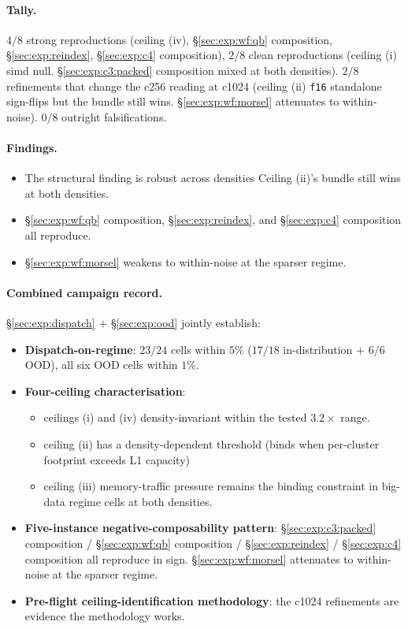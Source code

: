 \paragraph{Tally.}
$4/8$ strong reproductions (ceiling (iv), §\ref{sec:exp:wf:qb} composition, §\ref{sec:exp:reindex}, §\ref{sec:exp:c4} composition), $2/8$ clean reproductions (ceiling (i) simd null. §\ref{sec:exp:c3:packed} composition mixed at both densities). $2/8$ refinements that change the c256 reading at c1024 (ceiling (ii) \texttt{f16} standalone sign-flips but the bundle still wins. §\ref{sec:exp:wf:morsel} attenuates to within-noise). $0/8$ outright falsifications.

\paragraph{Findings.}

\begin{itemize}
  \item  The structural finding is robust across densities Ceiling (ii)'s bundle still wins at both densities.
  \item  §\ref{sec:exp:wf:qb} composition, §\ref{sec:exp:reindex}, and §\ref{sec:exp:c4} composition all reproduce.
  \item §\ref{sec:exp:wf:morsel} weakens to within-noise at the sparser regime.
\end{itemize}


\paragraph{Combined campaign record.}
§\ref{sec:exp:dispatch} $+$ §\ref{sec:exp:ood} jointly establish:

\begin{itemize}
  \item \textbf{Dispatch-on-regime}: $23/24$ cells within $5\%$ ($17/18$ in-distribution $+$ $6/6$ OOD), all six OOD cells within $1\%$.
  \item \textbf{Four-ceiling characterisation}: 
  \begin{itemize}
    \item ceilings (i) and (iv) density-invariant within the tested $3.2\times$ range.
    \item ceiling (ii) has a density-dependent threshold (binds when per-cluster footprint exceeds L1 capacity)
    \item ceiling (iii) memory-traffic pressure remains the binding constraint in big-data regime cells at both densities.
  \end{itemize}
  \item \textbf{Five-instance negative-composability pattern}: §\ref{sec:exp:c3:packed} composition / §\ref{sec:exp:wf:qb} composition / §\ref{sec:exp:reindex} / §\ref{sec:exp:c4} composition all reproduce in sign. §\ref{sec:exp:wf:morsel} attenuates to within-noise at the sparser regime.
  \item \textbf{Pre-flight ceiling-identification methodology}: the c1024 refinements are evidence the methodology works.
\end{itemize}

